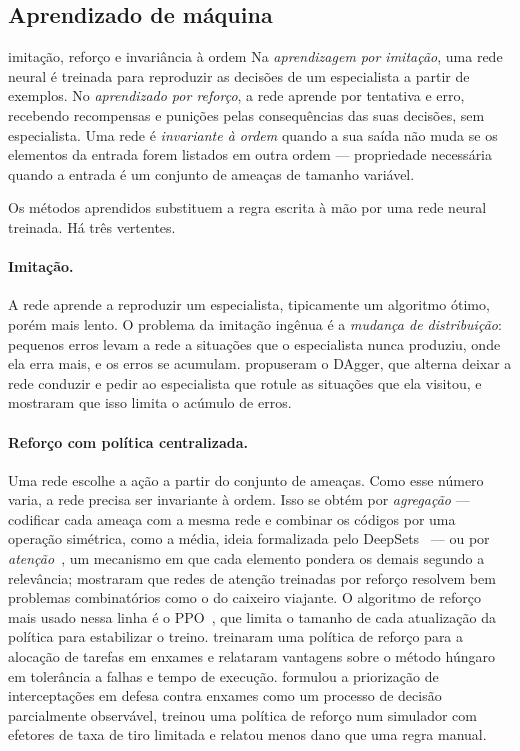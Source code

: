 \subsection{Aprendizado de máquina}

\begin{conceitobox}{imitação, reforço e invariância à ordem}
Na \emph{aprendizagem por imitação}, uma rede neural é treinada para reproduzir as decisões de um especialista a partir de
exemplos. No \emph{aprendizado por reforço}, a rede aprende por tentativa e erro, recebendo recompensas e punições pelas
consequências das suas decisões, sem especialista. Uma rede é \emph{invariante à ordem} quando a sua saída não muda se os
elementos da entrada forem listados em outra ordem --- propriedade necessária quando a entrada é um conjunto de ameaças de
tamanho variável.
\end{conceitobox}

Os métodos aprendidos substituem a regra escrita à mão por uma rede neural treinada. Há três vertentes.

\paragraph{Imitação.} A rede aprende a reproduzir um especialista, tipicamente um algoritmo ótimo, porém mais lento. O
problema da imitação ingênua é a \emph{mudança de distribuição}: pequenos erros levam a rede a situações que o especialista
nunca produziu, onde ela erra mais, e os erros se acumulam. \citet{ross2011} propuseram o DAgger, que alterna deixar a rede
conduzir e pedir ao especialista que rotule as situações que ela visitou, e mostraram que isso limita o acúmulo de erros.

\paragraph{Reforço com política centralizada.} Uma rede escolhe a ação a partir do conjunto de ameaças. Como esse número
varia, a rede precisa ser invariante à ordem. Isso se obtém por \emph{agregação} --- codificar cada ameaça com a mesma rede e
combinar os códigos por uma operação simétrica, como a média, ideia formalizada pelo DeepSets~\cite{zaheer2017} --- ou por
\emph{atenção}~\cite{vaswani2017}, um mecanismo em que cada elemento pondera os demais segundo a relevância;
\citet{kool2019} mostraram que redes de atenção treinadas por reforço resolvem bem problemas combinatórios como o do caixeiro
viajante. O algoritmo de reforço mais usado nessa linha é o PPO~\cite{schulman2017}, que limita o tamanho de cada atualização
da política para estabilizar o treino. \citet{liu2023drones} treinaram uma política de reforço para a alocação de tarefas
em enxames e relataram vantagens sobre o método húngaro em tolerância a falhas e tempo de execução. \citet{palmas2025}
formulou a priorização de interceptações em defesa contra enxames como um processo de decisão parcialmente observável,
treinou uma política de reforço num simulador com efetores de taxa de tiro limitada e relatou menos dano que uma regra
manual.

